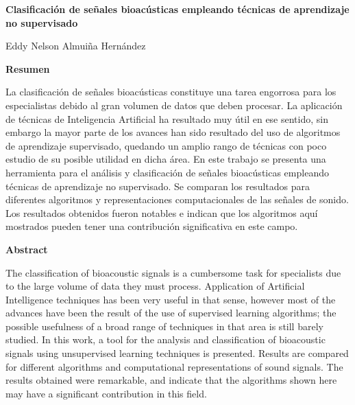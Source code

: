 \thispagestyle{empty}

\begin{center}
    \Large
    \textbf{Clasificación de señales bioacústicas empleando técnicas de aprendizaje no supervisado}

    \vspace{0.4cm}
    \large
    Eddy Nelson Almuiña Hernández

    \vspace{0.9cm}
    \textbf{Resumen}
\end{center}

La clasificación de señales bioacústicas constituye una tarea engorrosa para los especialistas debido al gran volumen de datos que deben procesar.
La aplicación de técnicas de Inteligencia Artificial ha resultado muy útil en ese sentido, sin embargo la mayor parte de los avances han sido resultado del uso de algoritmos de aprendizaje supervisado, quedando un amplio rango de técnicas con poco estudio de su posible utilidad en dicha área.
En este trabajo se presenta una herramienta para el análisis y clasificación de señales bioacústicas empleando técnicas de aprendizaje no supervisado.
Se comparan los resultados para diferentes algoritmos y representaciones computacionales de las señales de sonido.
Los resultados obtenidos fueron notables e indican que los algoritmos aquí mostrados pueden tener una contribución significativa en este campo.

\begin{center}
    \vspace{0.9cm}
    \textbf{Abstract}
\end{center}

The classification of bioacoustic signals is a cumbersome task for specialists due to the large volume of data they must process.
Application of Artificial Intelligence techniques has been very useful in that sense, however most of the advances have been the result of the use of supervised learning algorithms;
the possible usefulness of a broad range of techniques in that area is still barely studied.
In this work, a tool for the analysis and classification of bioacoustic signals using unsupervised learning techniques is presented.
Results are compared for different algorithms and computational representations of sound signals.
The results obtained were remarkable, and indicate that the algorithms shown here may have a significant contribution in this field.

\newpage